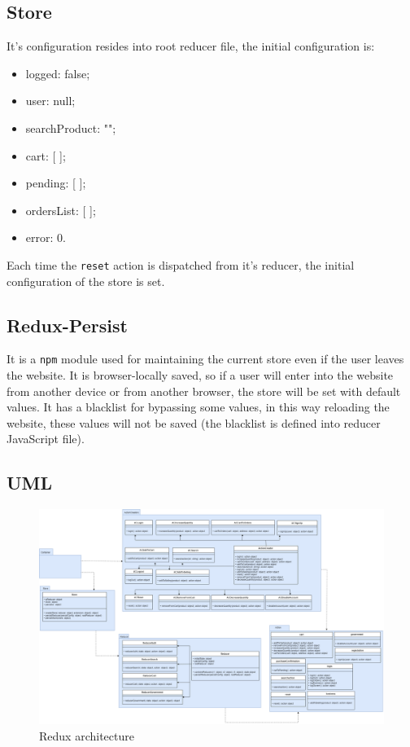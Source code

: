 \subsection{Store}
It's configuration resides into root reducer file, the initial configuration is:
\begin{itemize}
	\item logged: false;
	\item user: null;
	\item searchProduct: "";
	\item cart: [ ];
	\item pending: [ ];
	\item ordersList: [ ];
	\item error: 0.
\end{itemize}
Each time the \texttt{reset} action is dispatched from it's reducer, the initial configuration of the store is set.

\subsection{Redux-Persist}
It is a \texttt{npm} module used for maintaining the current store even if the user leaves the website. It is browser-locally saved, so if a user will enter into the website from another device or from another browser, the store will be set with default values. It has a blacklist for bypassing some values, in this way reloading the website, these values will not be saved (the blacklist is defined into reducer JavaScript file).

\begin{landscape}
	\subsection{UML} 
	
	\begin{figure}[H]
		\centering\includegraphics[scale = 0.3]{res/images/ReduxDiagram.png}
		\caption{Redux architecture}
	\end{figure}
\end{landscape}